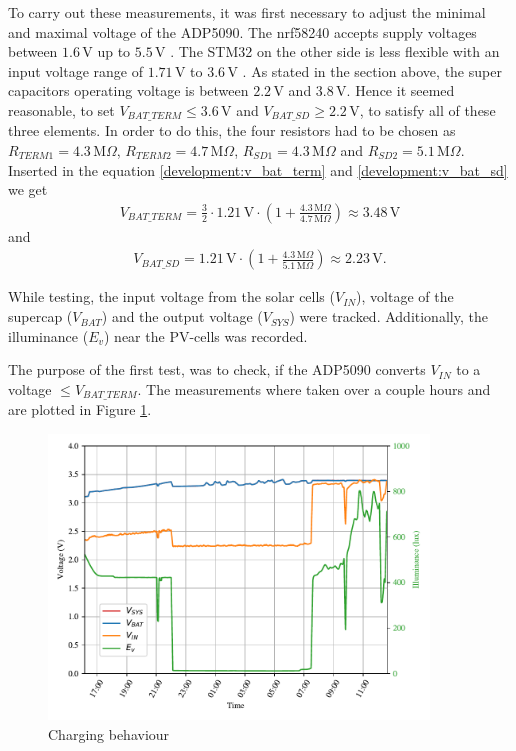 To carry out these measurements, it was first necessary to adjust the minimal and maximal voltage of the ADP5090.
The nrf58240 accepts supply voltages between $1.6\,\text{V}$ up to $5.5\,\text{V}$ \cite{nrf}.
The STM32 on the other side is less flexible with an input voltage range of $1.71\,\text{V}$ to $3.6\,\text{V}$ \cite{stm32}.
As stated in the section above, the super capacitors operating voltage is between $2.2\,\text{V}$ and $3.8\,\text{V}$.
Hence it seemed reasonable, to set $V_{BAT\_TERM} \le 3.6\,\text{V}$ and $V_{BAT\_SD} \ge 2.2\,\text{V}$, to satisfy all of these three elements.
In order to do this, the four resistors had to be chosen as $R_{TERM1} = 4.3\,\text{M}\Omega$, $R_{TERM2} = 4.7\,\text{M}\Omega$, $R_{SD1} = 4.3\,\text{M}\Omega$ and $R_{SD2} = 5.1\,\text{M}\Omega$.
Inserted in the equation \eqref{development:v_bat_term} and \eqref{development:v_bat_sd} we get
\begin{align*}
	V_{BAT\_TERM}= \frac{3}{2}\cdot 1.21\,\text{V}\cdot \left(1 + \frac{4.3\,\text{M}\Omega}{4.7 \,\text{M}\Omega} \right) \approx 3.48\,\text{V} 
\end{align*}
and
\begin{align*}
	V_{BAT\_SD} = 1.21\,\text{V}\cdot \left(1 + \frac{4.3\,\text{M}\Omega}{5.1\,\text{M}\Omega} \right) \approx 2.23\,\text{V}. 
\end{align*}

While testing, the input voltage from the solar cells ($V_{IN}$), voltage of the supercap ($V_{BAT}$) and the output voltage ($V_{SYS}$) were tracked. Additionally, the illuminance ($E_v$) near the PV-cells  was recorded.

The purpose of the first test, was to check, if the ADP5090 converts $V_{IN}$ to a voltage $\le V_{BAT\_TERM}$.
The measurements where taken over a couple hours and are plotted in Figure \ref{development:charge}.

\begin{figure}[ht]
	\centering
	\includegraphics[width=0.9\textwidth]{5-development/hardware/graphics/laden.pdf}
	\caption{Charging behaviour\label{development:charge}}
\end{figure}

